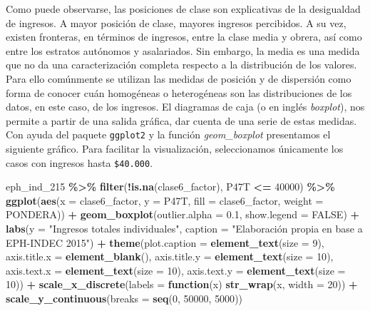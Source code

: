 \documentclass[
]{article}
\newenvironment{Shaded}{\begin{snugshade}}{\end{snugshade}}
\newcommand{\AttributeTok}[1]{\textcolor[rgb]{0.13,0.29,0.53}{#1}}
\newcommand{\ConstantTok}[1]{\textcolor[rgb]{0.56,0.35,0.01}{#1}}
\newcommand{\ControlFlowTok}[1]{\textcolor[rgb]{0.13,0.29,0.53}{\textbf{#1}}}
\newcommand{\DecValTok}[1]{\textcolor[rgb]{0.00,0.00,0.81}{#1}}
\newcommand{\FloatTok}[1]{\textcolor[rgb]{0.00,0.00,0.81}{#1}}
\newcommand{\FunctionTok}[1]{\textcolor[rgb]{0.13,0.29,0.53}{\textbf{#1}}}
\newcommand{\NormalTok}[1]{#1}
\newcommand{\SpecialCharTok}[1]{\textcolor[rgb]{0.81,0.36,0.00}{\textbf{#1}}}
\newcommand{\StringTok}[1]{\textcolor[rgb]{0.31,0.60,0.02}{#1}}
\begin{document}
Como puede observarse, las posiciones de clase son explicativas de la desigualdad de ingresos. A mayor posición de clase, mayores ingresos percibidos. A su vez, existen fronteras, en términos de ingresos, entre la clase media y obrera, así como entre los estratos autónomos y asalariados. Sin embargo, la media es una medida que no da una caracterización completa respecto a la distribución de los valores. Para ello comúnmente se utilizan las medidas de posición y de dispersión como forma de conocer cuán homogéneas o heterogéneas son las distribuciones de los datos, en este caso, de los ingresos. El diagramas de caja (o en inglés \emph{boxplot}), nos permite a partir de una salida gráfica, dar cuenta de una serie de estas medidas. Con ayuda del paquete \texttt{ggplot2} y la función \emph{geom\_boxplot} presentamos el siguiente gráfico. Para facilitar la visualización, seleccionamos únicamente los casos con ingresos hasta \texttt{\$40.000}.

\begin{Shaded}
\begin{Highlighting}[]
\NormalTok{eph\_ind\_215 }\SpecialCharTok{\%\textgreater{}\%}
    \FunctionTok{filter}\NormalTok{(}\SpecialCharTok{!}\FunctionTok{is.na}\NormalTok{(clase6\_factor), P47T }\SpecialCharTok{\textless{}=} \DecValTok{40000}\NormalTok{) }\SpecialCharTok{\%\textgreater{}\%}
    \FunctionTok{ggplot}\NormalTok{(}\FunctionTok{aes}\NormalTok{(}\AttributeTok{x =}\NormalTok{ clase6\_factor, }\AttributeTok{y =}\NormalTok{ P47T, }\AttributeTok{fill =}\NormalTok{ clase6\_factor, }\AttributeTok{weight =}\NormalTok{ PONDERA)) }\SpecialCharTok{+}
    \FunctionTok{geom\_boxplot}\NormalTok{(}\AttributeTok{outlier.alpha =} \FloatTok{0.1}\NormalTok{, }\AttributeTok{show.legend =} \ConstantTok{FALSE}\NormalTok{) }\SpecialCharTok{+} \FunctionTok{labs}\NormalTok{(}\AttributeTok{y =} \StringTok{"Ingresos totales individuales"}\NormalTok{,}
    \AttributeTok{caption =} \StringTok{"Elaboración propia en base a EPH{-}INDEC 2015"}\NormalTok{) }\SpecialCharTok{+} \FunctionTok{theme}\NormalTok{(}\AttributeTok{plot.caption =} \FunctionTok{element\_text}\NormalTok{(}\AttributeTok{size =} \DecValTok{9}\NormalTok{),}
    \AttributeTok{axis.title.x =} \FunctionTok{element\_blank}\NormalTok{(), }\AttributeTok{axis.title.y =} \FunctionTok{element\_text}\NormalTok{(}\AttributeTok{size =} \DecValTok{10}\NormalTok{), }\AttributeTok{axis.text.x =} \FunctionTok{element\_text}\NormalTok{(}\AttributeTok{size =} \DecValTok{10}\NormalTok{),}
    \AttributeTok{axis.text.y =} \FunctionTok{element\_text}\NormalTok{(}\AttributeTok{size =} \DecValTok{10}\NormalTok{)) }\SpecialCharTok{+} \FunctionTok{scale\_x\_discrete}\NormalTok{(}\AttributeTok{labels =} \ControlFlowTok{function}\NormalTok{(x) }\FunctionTok{str\_wrap}\NormalTok{(x,}
    \AttributeTok{width =} \DecValTok{20}\NormalTok{)) }\SpecialCharTok{+} \FunctionTok{scale\_y\_continuous}\NormalTok{(}\AttributeTok{breaks =} \FunctionTok{seq}\NormalTok{(}\DecValTok{0}\NormalTok{, }\DecValTok{50000}\NormalTok{, }\DecValTok{5000}\NormalTok{))}
\end{Highlighting}
\end{Shaded}
\end{document}
